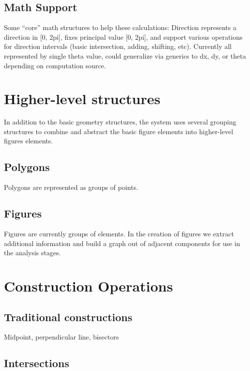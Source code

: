 \subsection{Math Support}

Some ``core'' math structures to help these calculations: Direction
represents a direction in [0, 2pi], fixes principal value [0, 2pi],
and support various operations for direction intervals (basic
intersection, adding, shifting, etc). Currently all represented by
single theta value, could generalize via generics to dx, dy, or theta
depending on computation source.

\section{Higher-level structures}

In addition to the basic geometry structures, the system uses several
grouping structures to combine and abstract the basic figure elements
into higher-level figures elements.

\subsection{Polygons}

Polygons are represented as groups of points.

\subsection{Figures}

Figures are currently groups of elements. In the creation of figures
we extract additional information and build a graph out of adjacent
components for use in the analysis stages.

\section{Construction Operations}

\subsection{Traditional constructions}

Midpoint, perpendicular line, bisectors

\subsection{Intersections}

